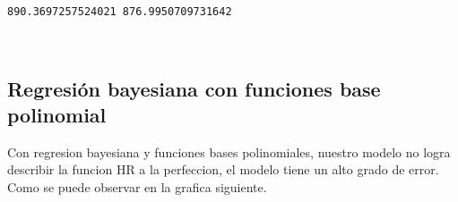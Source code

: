 \documentclass[11pt]{article}
\begin{document}
    \begin{Verbatim}[commandchars=\\\{\}]
890.3697257524021 876.9950709731642

    \end{Verbatim}

    \begin{center}
    \end{center}
    { \hspace*{\fill} \\}
    
    \subsection{Regresión bayesiana con funciones base
polinomial}\label{regresiuxf3n-bayesiana-con-funciones-base-polinomial}

    Con regresion bayesiana y funciones bases polinomiales, nuestro modelo
no logra describir la funcion HR a la perfeccion, el modelo tiene un
alto grado de error. Como se puede observar en la grafica siguiente.
\end{document}
